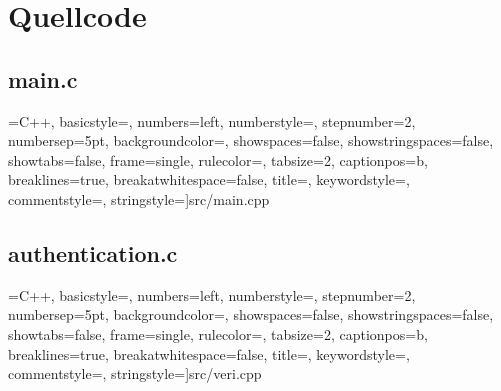 \section{Quellcode}
\label{quellcode}

\subsection{main.c}
\label{main}
 =C++,  
									basicstyle=\footnotesize,           
  								numbers=left,                   
  								numberstyle=\tiny\color{gray},  
  								stepnumber=2,
  								numbersep=5pt,                  
    							backgroundcolor=\color{white},     
 									showspaces=false,               
  								showstringspaces=false,         
    							showtabs=false,                 
    							frame=single,                  
    							rulecolor=\color{black},       
  								tabsize=2,                     
  								captionpos=b,                  
  								breaklines=true,                
  								breakatwhitespace=false,        
  								title=\lstname,                   
  								keywordstyle=\color{blue},          
 									commentstyle=\color{dkgreen},       
  								stringstyle=\color{mauve}]{src/main.cpp }
  								
\subsection{authentication.c}
\label{authenticatio}
 =C++,  
									basicstyle=\footnotesize,           
  								numbers=left,                   
  								numberstyle=\tiny\color{gray},  
  								stepnumber=2,
  								numbersep=5pt,                  
    							backgroundcolor=\color{white},     
 									showspaces=false,               
  								showstringspaces=false,         
    							showtabs=false,                 
    							frame=single,                  
    							rulecolor=\color{black},       
  								tabsize=2,                     
  								captionpos=b,                  
  								breaklines=true,                
  								breakatwhitespace=false,        
  								title=\lstname,                   
  								keywordstyle=\color{blue},          
 									commentstyle=\color{dkgreen},       
  								stringstyle=\color{mauve}]{src/veri.cpp }
